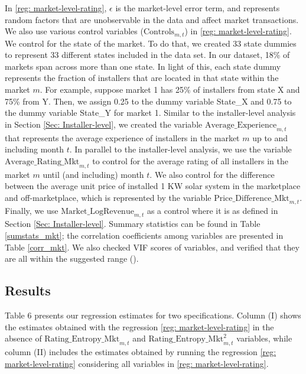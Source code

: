 \documentclass[msom,blindrev]{informs3}
\begin{document}
	
	In \eqref{reg: market-level-rating}, $\epsilon$ is the market-level error term, and represents random factors that are unobservable in the data and affect market transactions. We also use various control variables ($\text{Controls}_{m,t}$) in \eqref{reg: market-level-rating}. We control for the state of the market. To do that, we created 33 state dummies to represent 33 different states included in the data set. In our dataset, 18\% of markets span across more than one state.  In light of this, each state dummy represents the fraction of installers that are located in that state within the market $m$. For example, suppose market 1 has 25\% of installers from state X and 75\% from Y. Then, we assign 0.25 to the dummy variable State\_X and 0.75 to the dummy variable State\_Y for market 1.  Similar to the installer-level analysis in Section \ref{Sec: Installer-level}, we created the variable $\text{Average\_Experience}_{m,t}$ that represents the average experience of installers in the market $m$ up to and including month $t$. In parallel to the installer-level analysis, we use the variable $\text{Average\_Rating\_Mkt}_{m,t}$ to control for the average rating of all installers in the market $m$ until (and including) month $t$. We also control for the difference between the average unit price of installed 1 KW solar system in the marketplace and off-marketplace, which is represented by the variable $\text{Price\_Difference\_Mkt}_{m,t}$. Finally, we use $\text{Market\_LogRevenue}_{m,t}$ as a control where it is as defined in Section \ref{Sec: Installer-level}. Summary statistics can be found in Table \ref{sumstats_mkt}; the correlation coefficients among variables are presented in Table \ref{corr_mkt}.  We also checked VIF scores of variables, and verified that they are all within the suggested range (\cite{hairmultivariate}).


	
	
	
	\subsection{Results}
	
	
	Table 6 presents our regression estimates for two specifications. Column (I) shows the estimates obtained with the regression \eqref{reg: market-level-rating} in the absence of $\text{Rating\_Entropy\_Mkt}_{m,t}$ and $\text{Rating\_Entropy\_Mkt}^2_{m,t}$ variables, while column (II) includes the estimates obtained by running the regression \eqref{reg: market-level-rating} considering all variables in \eqref{reg: market-level-rating}.
	
\end{document}
